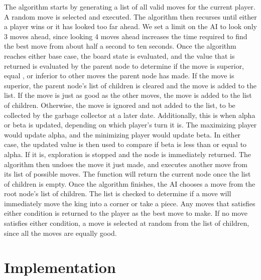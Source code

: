 \documentclass{article}
\begin{document}
	The algorithm starts by generating a list of all valid moves for the current player. A random move is selected and executed. The algorithm then recurses until either a player wins or it has looked too far ahead. We set a limit on the AI to look only 3 moves ahead, since looking 4 moves ahead increases the time required to find the best move from about half a second to ten seconds. Once the algorithm reaches either base case, the board state is evaluated, and the value that is returned is evaluated by the parent node to determine if the move is superior, equal , or inferior to other moves the parent node has made. If the move is superior, the parent node's list of children is cleared and the move is added to the list. If the move is just as good as the other moves, the move is added to the list of children. Otherwise, the move is ignored and not added to the list, to be collected by the garbage collector at a later date. Additionally, this is when alpha or beta is updated, depending on which player's turn it is. The maximizing player would update alpha, and the minimizing player would update beta. In either case, the updated value is then used to compare if beta is less than or equal to alpha. If it is, exploration is stopped and the node is immediately returned. The algorithm then undoes the move it just made, and executes another move from its list of possible moves. The function will return the current node once the list of children is empty. Once the algorithm finishes, the AI chooses a move from the root node's list of children. The list is checked to determine if a move will immediately move the king into a corner or take a piece. Any moves that satisfies either condition is returned to the player as the best move to make. If no move satisfies either condition, a move is selected at random from the list of children, since all the moves are equally good.

\section{Implementation}
\end{document}
